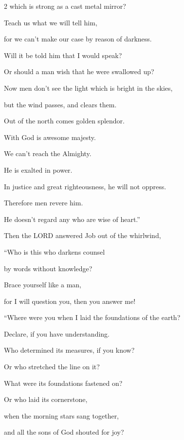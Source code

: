 \begin{multicols}{2}
	which is strong as a cast metal mirror?
	
	\myverse{}Teach us what we will tell him,
	
	for we can’t make our case by reason of darkness.
	
	\myverse{}Will it be told him that I would speak?
	
	Or should a man wish that he were swallowed up?
	
	\vspace{\baselineskip}
	
	\myverse{}Now men don’t see the light which is bright in the skies,
	
	but the wind passes, and clears them.
	
	\myverse{}Out of the north comes golden splendor.
	
	With God is awesome majesty.
	
	\myverse{}We can’t reach the Almighty.
	
	He is exalted in power.
	
	In justice and great righteousness, he will not oppress.
	
	\myverse{}Therefore men revere him.
	
	He doesn’t regard any who are wise of heart.”
	
	
	
	\mychapter{} \myverse*{}Then the LORD answered Job out of the whirlwind,
	
\quad\quad	\myverse{}“Who is this who darkens counsel
	
	by words without knowledge?
	
	\myverse{}Brace yourself like a man,
	
	for I will question you, then you answer me!
	
	\vspace{\baselineskip}
	
	\myverse{}“Where were you when I laid the foundations of the earth?
	
	Declare, if you have understanding.
	
	\myverse{}Who determined its measures, if you know?
	
	Or who stretched the line on it?
	
	\myverse{}What were its foundations fastened on?
	
	Or who laid its cornerstone,
	
	\myverse{}when the morning stars sang together,
	
	and all the sons of God shouted for joy?
	

\end{multicols}
